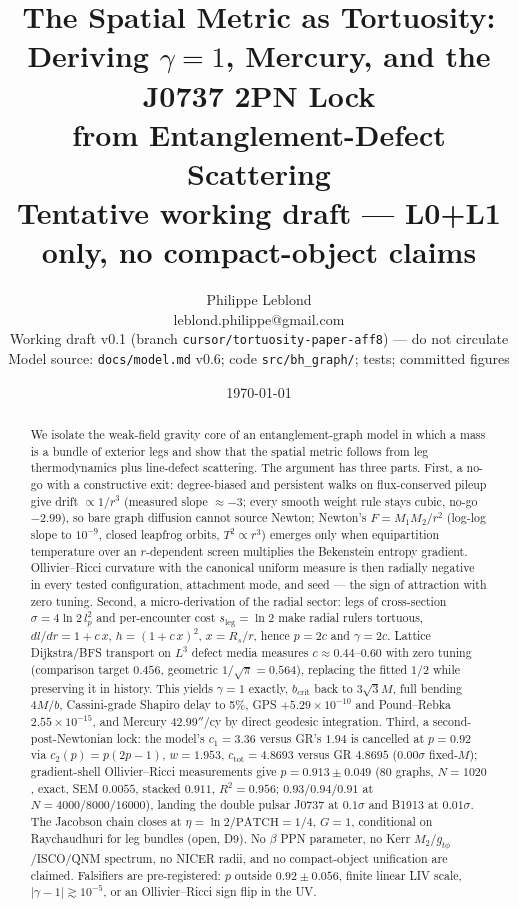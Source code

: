 \documentclass[11pt]{article}
\title{The Spatial Metric as Tortuosity:\\
Deriving $\gamma = 1$, Mercury, and the J0737 2PN Lock\\
from Entanglement-Defect Scattering\\
\large Tentative working draft --- L0+L1 only, no compact-object claims}
\author{Philippe Leblond \\ \small leblond.philippe@gmail.com \\
\small Working draft v0.1 (branch \texttt{cursor/tortuosity-paper-aff8}) --- do not circulate \\
\small Model source: \texttt{docs/model.md} v0.6; code \texttt{src/bh\_graph/}; tests; committed figures}
\date{\today}
\begin{document}
\maketitle

\begin{center}
\end{center}

\begin{abstract}
We isolate the weak-field gravity core of an entanglement-graph model in which a mass is a bundle of exterior legs and show that the spatial metric follows from leg thermodynamics plus line-defect scattering. The argument has three parts. First, a no-go with a constructive exit: degree-biased and persistent walks on flux-conserved pileup give drift $\propto 1/r^3$ (measured slope $\approx -3$; every smooth weight rule stays cubic, no-go $-2.99$), so bare graph diffusion cannot source Newton; Newton's $F = M_1M_2/r^2$ (log-log slope to $10^{-9}$, closed leapfrog orbits, $T^2 \propto r^3$) emerges only when equipartition temperature over an $r$-dependent screen multiplies the Bekenstein entropy gradient. Ollivier--Ricci curvature with the canonical uniform measure is then radially negative in every tested configuration, attachment mode, and seed --- the sign of attraction with zero tuning. Second, a micro-derivation of the radial sector: legs of cross-section $\sigma = 4\ln 2\,l_p^2$ and per-encounter cost $s_{\mathrm{leg}} = \ln 2$ make radial rulers tortuous, $dl/dr = 1 + c\,x$, $h = (1+c\,x)^2$, $x = R_s/r$, hence $p = 2c$ and $\gamma = 2c$. Lattice Dijkstra/BFS transport on $L^3$ defect media measures $c \approx 0.44$--$0.60$ with zero tuning (comparison target $0.456$, geometric $1/\sqrt{\pi} = 0.564$), replacing the fitted $1/2$ while preserving it in history. This yields $\gamma = 1$ exactly, $b_{\mathrm{crit}}$ back to $3\sqrt{3}M$, full bending $4M/b$, Cassini-grade Shapiro delay to 5\%, GPS $+5.29\times 10^{-10}$ and Pound--Rebka $2.55\times 10^{-15}$, and Mercury $42.99''$/cy by direct geodesic integration. Third, a second-post-Newtonian lock: the model's $c_1 = 3.36$ versus GR's $1.94$ is cancelled at $p = 0.92$ via $c_2(p) = p(2p-1)$, $w = 1.953$, $c_{\mathrm{tot}} = 4.8693$ versus GR $4.8695$ ($0.00\sigma$ fixed-$M$); gradient-shell Ollivier--Ricci measurements give $p = 0.913 \pm 0.049$ (80 graphs, $N = 1020$, exact, SEM $0.0055$, stacked $0.911$, $R^2 = 0.956$; $0.93/0.94/0.91$ at $N = 4000/8000/16000$), landing the double pulsar J0737 at $0.1\sigma$ and B1913 at $0.01\sigma$. The Jacobson chain closes at $\eta = \ln 2/\mathrm{PATCH} = 1/4$, $G = 1$, conditional on Raychaudhuri for leg bundles (open, D9). No $\beta$ PPN parameter, no Kerr $M_2$/$g_{t\phi}$/ISCO/QNM spectrum, no NICER radii, and no compact-object unification are claimed. Falsifiers are pre-registered: $p$ outside $0.92 \pm 0.056$, finite linear LIV scale, $|\gamma - 1| \gtrsim 10^{-5}$, or an Ollivier--Ricci sign flip in the UV.
\end{abstract}
\end{document}
